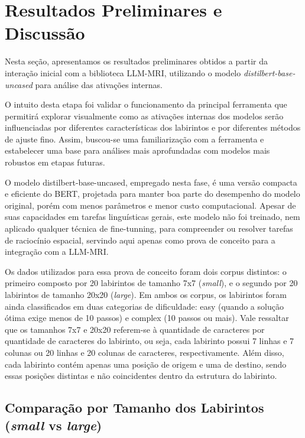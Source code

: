 \section{Resultados Preliminares e Discussão}\label{sec:resultados-discussao}

Nesta seção, apresentamos os resultados preliminares obtidos a partir da interação inicial com a biblioteca LLM-MRI, utilizando o modelo \textit{distilbert-base-uncased} para análise das ativações internas.

O intuito desta etapa foi validar o funcionamento da principal ferramenta que permitirá explorar visualmente como as ativações internas dos modelos serão influenciadas por diferentes características dos labirintos e por diferentes métodos de ajuste fino. Assim, buscou-se uma familiarização com a ferramenta e estabelecer uma base para análises mais aprofundadas com modelos mais robustos em etapas futuras.

O modelo distilbert-base-uncased, empregado nesta fase, é uma versão compacta e eficiente do BERT, projetada para manter boa parte do desempenho do modelo original, porém com menos parâmetros e menor custo computacional. Apesar de suas capacidades em tarefas linguísticas gerais, este modelo não foi treinado, nem aplicado qualquer técnica de fine-tunning, para compreender ou resolver tarefas de raciocínio espacial, servindo aqui apenas como prova de conceito para a integração com a LLM-MRI.

Os dados utilizados para essa prova de conceito foram dois corpus distintos: o primeiro composto por 20 labirintos de tamanho 7x7 (\textit{small}), e o segundo por 20 labirintos de tamanho 20x20 (\textit{large}). Em ambos os corpus, os labirintos foram ainda classificados em duas categorias de dificuldade: easy (quando a solução ótima exige menos de 10 passos) e complex (10 passos ou mais). Vale ressaltar que os tamanhos 7x7 e 20x20 referem-se à quantidade de caracteres por quantidade de caracteres do labirinto, ou seja, cada labirinto possui 7 linhas e 7 colunas ou 20 linhas e 20 colunas de caracteres, respectivamente. Além disso, cada labirinto contém apenas uma posição de origem e uma de destino, sendo essas posições distintas e não coincidentes dentro da estrutura do labirinto.

\subsection*{Comparação por Tamanho dos Labirintos (\textit{small} vs \textit{\textit{large}})}

